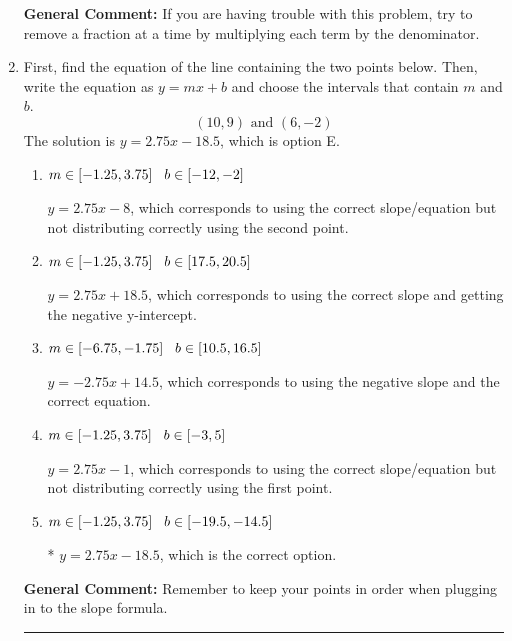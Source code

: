 \documentclass{extbook}[14pt]
\newcommand{\litem}[1]{\item #1

\rule{\textwidth}{0.4pt}}
\begin{document}
\begin{enumerate}
{\textbf{General Comment:} If you are having trouble with this problem, try to remove a fraction at a time by multiplying each term by the denominator.
}
\litem{
First, find the equation of the line containing the two points below. Then, write the equation as $ y=mx+b $ and choose the intervals that contain $m$ and $b$.
\[ (10, 9) \text{ and } (6, -2) \]The solution is \( y = 2.75x -18.5 \), which is option E.\begin{enumerate}[label=\Alph*.]
\item \( m \in [-1.25, 3.75] \hspace*{3mm} b \in [-12, -2] \)

 $y = 2.75x -8$, which corresponds to using the correct slope/equation but not distributing correctly using the second point.
\item \( m \in [-1.25, 3.75] \hspace*{3mm} b \in [17.5, 20.5] \)

 $y = 2.75x + 18.5$, which corresponds to using the correct slope and getting the negative y-intercept.
\item \( m \in [-6.75, -1.75] \hspace*{3mm} b \in [10.5, 16.5] \)

 $y = -2.75x + 14.5$, which corresponds to using the negative slope and the correct equation.
\item \( m \in [-1.25, 3.75] \hspace*{3mm} b \in [-3, 5] \)

 $y = 2.75x -1$, which corresponds to using the correct slope/equation but not distributing correctly using the first point.
\item \( m \in [-1.25, 3.75] \hspace*{3mm} b \in [-19.5, -14.5] \)

* $y = 2.75x -18.5$, which is the correct option.
\end{enumerate}

\textbf{General Comment:} Remember to keep your points in order when plugging in to the slope formula.
}
\end{enumerate}
\end{document}

